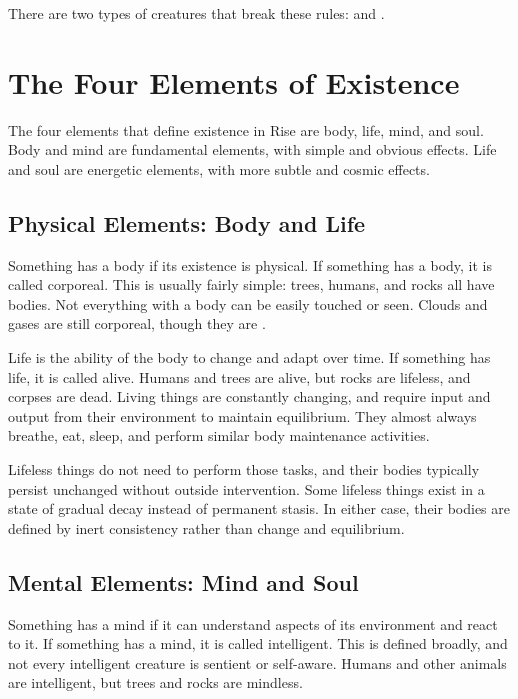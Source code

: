   There are two types of creatures that break these rules:  and .

\section{The Four Elements of Existence}

  The four elements that define existence in Rise are body, life, mind, and soul.
  Body and mind are fundamental elements, with simple and obvious effects.
  Life and soul are energetic elements, with more subtle and cosmic effects.

  \subsection{Physical Elements: Body and Life}
    Something has a body if its existence is physical.
    If something has a body, it is called corporeal.
    This is usually fairly simple: trees, humans, and rocks all have bodies.
    Not everything with a body can be easily touched or seen.
    Clouds and gases are still corporeal, though they are .

    Life is the ability of the body to change and adapt over time.
    If something has life, it is called alive.
    Humans and trees are alive, but rocks are lifeless, and corpses are dead.
    Living things are constantly changing, and require input and output from their environment to maintain equilibrium.
    They almost always breathe, eat, sleep, and perform similar body maintenance activities.

    Lifeless things do not need to perform those tasks, and their bodies typically persist unchanged without outside intervention.
    Some lifeless things exist in a state of gradual decay instead of permanent stasis.
    In either case, their bodies are defined by inert consistency rather than change and equilibrium.

  \subsection{Mental Elements: Mind and Soul}
    Something has a mind if it can understand aspects of its environment and react to it.
    If something has a mind, it is called intelligent.
    This is defined broadly, and not every intelligent creature is sentient or self-aware.
    Humans and other animals are intelligent, but trees and rocks are mindless.

